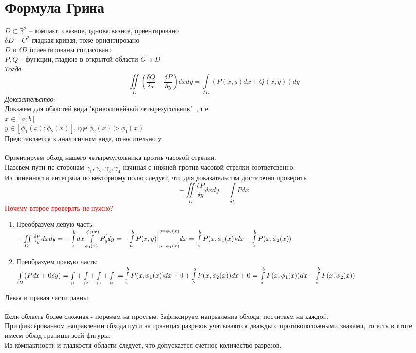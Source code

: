 \documentclass[paper=a4, fontsize=17pt]{article}
\begin{document}
\section{Формула Грина}
$D \subset \mathds{R}^2$ -- компакт, связное, одновясвязное, ориентировано\\$\delta D-C^2\text{-гладкая кривая, тоже ориентировано}$\\
$D$ и $\delta D$ ориентированы согласовано \\
$P, Q$ -- функции, гладкие в открытой области $O \supset D$ \\
\emph{Тогда:} $$\iint\limits_{D}(\frac{\delta Q}{\delta x} - \frac{\delta P}{\delta y})dxdy = \int\limits_{\delta D}(P(x,y)dx + Q(x,y))dy$$
\emph{Доказательство:} \\
Докажем для областей вида "криволинейный четырехугольник"\ , т.е. \\
$x \in [a;b]$ \\
$y \in [\phi_1(x);\phi_2(x)]$, где $\phi_2(x) > \phi_1(x)$ \\
Представляется в аналогичном виде, относительно y \\\\
Ориентируем обход нашего четырехугольника против часовой стрелки.\\
Назовем пути по сторонам $\gamma_1, \gamma_2, \gamma_3, \gamma_4$ начиная с нижней против часовой стрелки соответсвенно. \\
Из линейности интеграла по векторному полю следует, что для доказательства достаточно проверить: $$-\iint\limits_{D} \frac{\delta P}{\delta y}dxdy = \int\limits_{\delta D}Pdx$$ \textcolor{red}{Почему второе проверять не нужно?}
\begin{enumerate}
	\item Преобразуем левую часть:\\
		$-\iint\limits_{D} \frac{\delta P}{\delta y}dxdy = - \int\limits_{a}^bdx\int\limits_{\phi_1(x)}^{\phi_2(x)}P^{'}_ydy = -\int\limits_{a}^bP(x,y)\bigg|_{y=\phi_1(x)}^{y=\phi_2(x)}dx =\\ \int\limits_{a}^bP(x,\phi_1(x))dx - \int\limits_{a}^bP(x,\phi_2(x))$
	\item Преобразуем правую часть: \\
		$\int\limits_{\delta D}(Pdx + 0dy) = \int\limits_{\gamma_1}+\int\limits_{\gamma_2}+\int\limits_{\gamma_3}+\int\limits_{\gamma_4} \\ = \int\limits_{a}^bP(x,\phi_1(x))dx + 0 + \int\limits_{b}^aP(x, \phi_2(x))dx + 0 = \\ \int\limits_{a}^bP(x,\phi_1(x))dx - \int\limits_{a}^bP(x,\phi_2(x))$
\end{enumerate}
Левая и правая части равны. \\\\
Если область более сложная - порежем на простые. Зафиксируем направление обхода, посчитаем на каждой. \\
При фиксированном направлении обхода пути на границах разрезов учитываются дважды с противоположными знаками, то есть в итоге имеем обход границы всей фигуры.\\
Из компактности и гладкости области следует, что допускается счетное количество разрезов.
\end{document}
